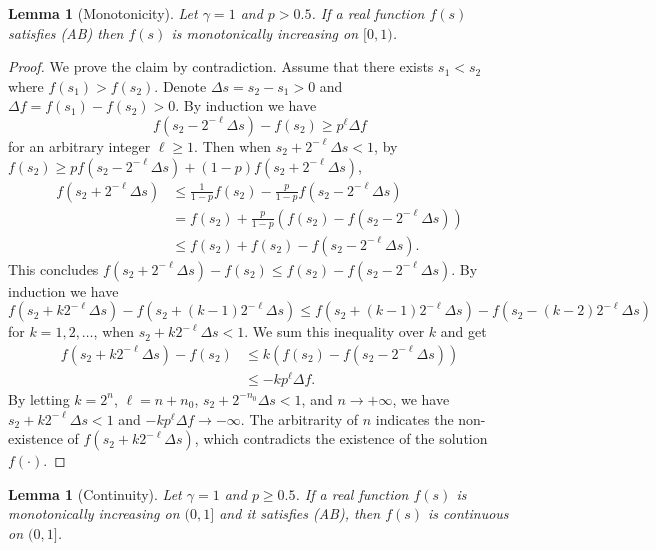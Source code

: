 \documentclass{article}
\newtheorem{lemma}[theorem]{Lemma}
\theoremstyle{named}
\begin{document}
\begin{lemma}[Monotonicity]
\label{thm:monotonicity}
Let $\gamma=1$ and $p>0.5$. If a real function $f(s)$ satisfies ({AB}) then $f(s)$ is monotonically increasing on $[0,1)$.
\end{lemma}

\begin{proof}
We prove the claim by contradiction. Assume that there exists $s_1<s_2$ where $f(s_1)>f(s_2)$. Denote $\Delta s=s_2-s_1>0$ and $\Delta f=f(s_1)-f(s_2)>0$. By induction we have
\[ f(s_2-2^{-\ell}\Delta s) - f(s_2) \geq p^\ell \Delta f \]
for an arbitrary integer $\ell\geq 1$.
Then when $s_2+2^{-\ell}\Delta s < 1$, by $f(s_2) \geq pf(s_2-2^{-\ell}\Delta s) + (1-p)f(s_2+2^{-\ell}\Delta s)$,
\begin{align*}
f(s_2+2^{-\ell}\Delta s) & \leq \frac{1}{1-p}f(s_2) - \frac{p}{1-p}f(s_2-2^{-\ell}\Delta s)\\
& = f(s_2) + \frac{p}{1-p}(f(s_2)-f(s_2-2^{-\ell}\Delta s))\\
& \leq f(s_2) + f(s_2)-f(s_2-2^{-\ell}\Delta s).
\end{align*}
This concludes $f(s_2+2^{-\ell}\Delta s) - f(s_2) \leq f(s_2)-f(s_2-2^{-\ell}\Delta s)$. By induction we have \[f(s_2+k2^{-\ell}\Delta s) - f(s_2+(k-1)2^{-\ell}\Delta s) \leq f(s_2+(k-1)2^{-\ell}\Delta s)-f(s_2-(k-2)2^{-\ell}\Delta s)\] 
for $k=1,2,\dots$, when $s_2+k2^{-\ell}\Delta s < 1$. We sum this inequality over $k$ and get
\begin{align*}
f(s_2+k2^{-\ell}\Delta s) - f(s_2) & \leq k(f(s_2)-f(s_2-2^{-\ell}\Delta s))\\
& \leq -kp^\ell\Delta f.
\end{align*}
By letting $k=2^{n}$, $\ell=n+n_0$, $s_2+2^{-n_0}\Delta s<1$, and $n\rightarrow +\infty$, we have $s_2+k2^{-\ell}\Delta s < 1$ and $-kp^\ell\Delta f\rightarrow -\infty$. The arbitrarity of $n$ indicates the non-existence of $f(s_2+k2^{-\ell}\Delta s)$, which contradicts the existence of the solution $f(\cdot)$. 
\end{proof}

\begin{lemma}[Continuity]
\label{thm:continuity}
Let $\gamma=1$ and $p\geq 0.5$. If a real function $f(s)$ is monotonically increasing on $(0,1]$ and it satisfies ({AB}), then $f(s)$ is continuous on $(0,1]$.
\end{lemma}
\end{document}
